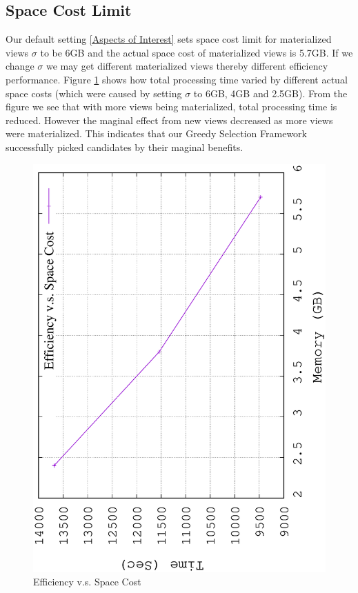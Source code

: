 \subsection{Space Cost Limit}
Our default setting \ref{Aspects of Interest} sets space cost limit for materialized views $\sigma$ to be 6GB and the actual space cost of materialized views is 5.7GB. If we change $\sigma$ we may get different materialized views thereby different efficiency performance. Figure \ref{fig:limit} shows how total processing time varied by different actual space costs (which were caused by setting $\sigma$ to 6GB, 4GB and 2.5GB). From the figure we see that with more views being materialized, total processing time is reduced. However the maginal effect from new views decreased as more views were materialized. This indicates that our Greedy Selection Framework successfully picked candidates by their maginal benefits.

\begin{figure}[H]
	\centering
	\includegraphics[scale=0.5, angle=270]{plot/limit.eps}
	\caption{Efficiency v.s. Space Cost}
	\label{fig:limit}
\end{figure}

